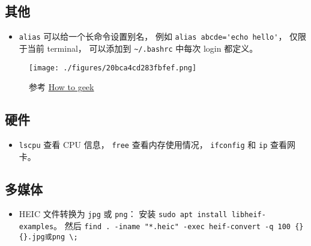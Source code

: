 \subsection{其他}
\begin{itemize}
\item \verb`alias` 可以给一个长命令设置别名， 例如 \verb|alias abcde='echo hello'|， 仅限于当前 terminal， 可以添加到 \verb|~/.bashrc| 中每次 login 都定义。
\end{itemize}

\begin{figure}[ht]
\centering
\texttt{[image: ./figures/20bca4cd283fbfef.png]}
\caption{参考 \href{https://www.howtogeek.com/}{How to geek}} \label{fig_LinNt_1}
\end{figure}

\subsection{硬件}
\begin{itemize}
\item \verb|lscpu| 查看 CPU 信息， \verb|free| 查看内存使用情况， \verb|ifconfig| 和 \verb|ip| 查看网卡。
\end{itemize}

\subsection{多媒体}
\begin{itemize}
\item HEIC 文件转换为 \verb|jpg| 或 \verb|png|： 安装 \verb|sudo apt install libheif-examples|。 然后 \verb|find . -iname "*.heic" -exec heif-convert -q 100 {} {}.jpg或png \;|
\end{itemize}
